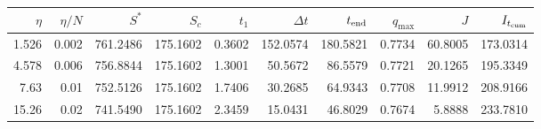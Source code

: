 {\setlength{\tabcolsep}{3pt}
\begin{tabular}{@{}rrrrrrrrrr@{}}
\toprule
$\eta$ & $\eta/N$ & $S^*$ & $S_c$ & $t_1$ & $\Delta t$ & $t_{\rm end}$ & $q_{\max}$ & $J$ & $I_{t_{\mathrm{cum}}}$ \\
\midrule
1.526 & 0.002 & 761.2486 & 175.1602 & 0.3602 & 152.0574 & 180.5821 & 0.7734 & 60.8005 & 173.0314 \\
4.578 & 0.006 & 756.8844 & 175.1602 & 1.3001 & 50.5672 & 86.5579 & 0.7721 & 20.1265 & 195.3349 \\
7.63 & 0.01 & 752.5126 & 175.1602 & 1.7406 & 30.2685 & 64.9343 & 0.7708 & 11.9912 & 208.9166 \\
15.26 & 0.02 & 741.5490 & 175.1602 & 2.3459 & 15.0431 & 46.8029 & 0.7674 & 5.8888 & 233.7810 \\
\bottomrule
\end{tabular}}
